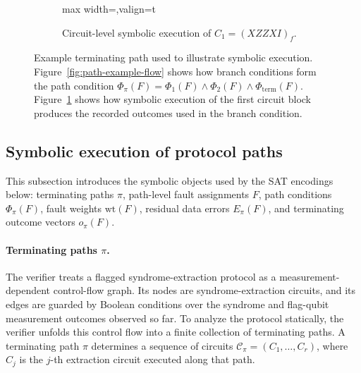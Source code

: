 \documentclass[acmsmall,screen,review,anonymous,nonacm]{acmart}
\begin{document}
{\begin{figure}[htbp]
\begin{subfigure}[t]{0.58\textwidth}
\begin{adjustbox}{max width=\textwidth,valign=t}
\begin{tikzpicture}[
every node/.style={font=\scriptsize},
outbox/.style={
draw,
rounded corners,
align=left,
inner sep=5pt,
minimum width=6.4cm
}
]
\end{tikzpicture}
\end{adjustbox}
\caption{Circuit-level symbolic execution of $C_1=(XZZXI)_f$.}
\label{fig:path-example-circuit}
\end{subfigure}

\caption{Example terminating path used to illustrate symbolic execution. Figure~\ref{fig:path-example-flow} shows how branch conditions form the path condition $\Phi_\pi(F)=\Phi_1(F)\land\Phi_2(F)\land\Phi_{\mathrm{term}}(F)$. Figure~\ref{fig:path-example-circuit} shows how symbolic execution of the first circuit block produces the recorded outcomes used in the branch condition.}
\label{fig:path-example}
\end{figure}


}
\subsection{Symbolic execution of protocol paths}
\label{subsec:symbolic-execution-paths}

\pathexample

This subsection introduces the symbolic objects used by the SAT encodings below: terminating paths $\pi$, path-level fault assignments $F$, path conditions $\Phi_\pi(F)$, fault weights $\mathrm{wt}(F)$, residual data errors $E_\pi(F)$, and terminating outcome vectors $o_\pi(F)$.

\paragraph{Terminating paths $\pi$.}
The verifier treats a flagged syndrome-extraction protocol as a measurement-dependent control-flow graph. Its nodes are syndrome-extraction circuits, and its edges are guarded by Boolean conditions over the syndrome and flag-qubit measurement outcomes observed so far. To analyze the protocol statically, the verifier unfolds this control flow into a finite collection of terminating paths. A terminating path $\pi$ determines a sequence of circuits $\mathcal{C}_\pi=(C_1,\ldots,C_r)$, where $C_j$ is the $j$-th extraction circuit executed along that path.
\end{document}
